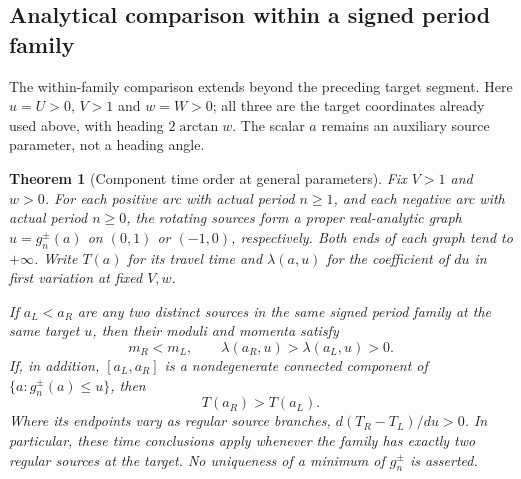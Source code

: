 \documentclass[11pt,a4paper]{article}
\newtheorem{theorem}{Theorem}[section]
\theoremstyle{remark}\newtheorem{remark}[theorem]{Remark}
\begin{document}
\subsection{Analytical comparison within a signed period family}

The within-family comparison extends beyond the preceding target segment.
Here $u=U>0$, $V>1$ and $w=W>0$; all three are the target coordinates
already used above, with heading $2\arctan w$. The scalar $a$ remains
an auxiliary source parameter, not a heading angle.

\begin{theorem}[Component time order at general parameters]
\label{thm:general-pair-order}
Fix $V>1$ and $w>0$. For each positive arc with actual period $n\ge1$,
and each negative arc with actual period $n\ge0$, the rotating sources
form a proper real-analytic graph $u=g_n^\pm(a)$ on $(0,1)$ or $(-1,0)$,
respectively. Both ends of each graph tend to $+\infty$.
Write $T(a)$ for its travel time and $\lambda(a,u)$ for the coefficient
of $du$ in first variation at fixed $V,w$.

If $a_L<a_R$ are any two distinct sources in the same signed period
family at the same target $u$, then their moduli and momenta satisfy
\begin{equation}\label{eq:general-source-order}
 m_R<m_L,\qquad \lambda(a_R,u)>\lambda(a_L,u)>0.
\end{equation}
If, in addition, $[a_L,a_R]$ is a nondegenerate connected component of
$\{a:g_n^\pm(a)\le u\}$, then
\begin{equation}\label{eq:general-component-time}
 T(a_R)>T(a_L).
\end{equation}
Where its endpoints vary as regular source branches,
$d(T_R-T_L)/du>0$. In particular, these time conclusions apply whenever
the family has exactly two regular sources at the target. No uniqueness
of a minimum of $g_n^\pm$ is asserted.
\end{theorem}
\end{document}

